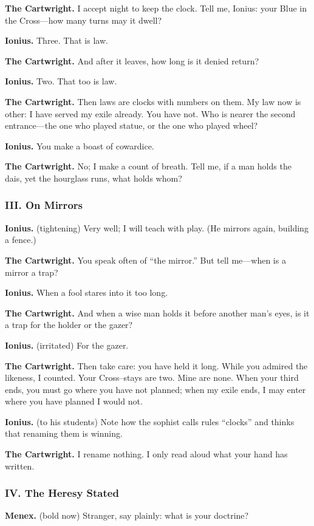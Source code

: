 \documentclass[11pt]{article}
\begin{document}
\noindent\textbf{The Cartwright.} I accept night to keep the clock. Tell me, Ionius: your Blue in the Cross—how many turns may it dwell?

\noindent\textbf{Ionius.} Three. That is law.

\noindent\textbf{The Cartwright.} And after it leaves, how long is it denied return?

\noindent\textbf{Ionius.} Two. That too is law.

\noindent\textbf{The Cartwright.} Then laws are clocks with numbers on them. My law now is other: I have served my exile already. You have not. Who is nearer the second entrance—the one who played statue, or the one who played wheel?

\noindent\textbf{Ionius.} You make a boast of cowardice.

\noindent\textbf{The Cartwright.} No; I make a count of breath. Tell me, if a man holds the dais, yet the hourglass runs, what holds whom?

\medskip
\subsubsection*{III. On Mirrors}
\noindent\textbf{Ionius.} (tightening) Very well; I will teach with play. (He mirrors again, building a fence.)

\noindent\textbf{The Cartwright.} You speak often of “the mirror.” But tell me—when is a mirror a trap?

\noindent\textbf{Ionius.} When a fool stares into it too long.

\noindent\textbf{The Cartwright.} And when a wise man holds it before another man’s eyes, is it a trap for the holder or the gazer?

\noindent\textbf{Ionius.} (irritated) For the gazer.

\noindent\textbf{The Cartwright.} Then take care: you have held it long. While you admired the likeness, I counted. Your Cross–stays are two. Mine are none. When your third ends, you must go where you have not planned; when my exile ends, I may enter where you have planned I would not.

\noindent\textbf{Ionius.} (to his students) Note how the sophist calls rules “clocks” and thinks that renaming them is winning.

\noindent\textbf{The Cartwright.} I rename nothing. I only read aloud what your hand has written.

\medskip
\subsubsection*{IV. The Heresy Stated}
\noindent\textbf{Menex.} (bold now) Stranger, say plainly: what is your doctrine?
\end{document}
